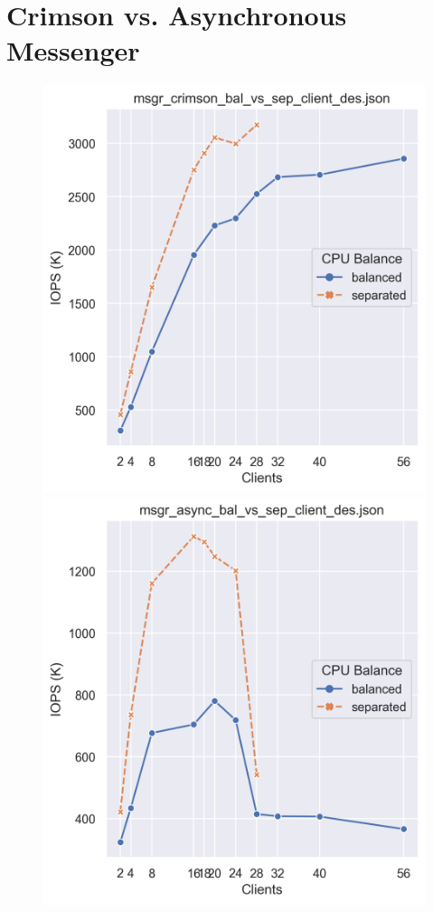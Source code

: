 
\chapter{Crimson vs. Asynchronous Messenger}

\graphicspath{ {../figures} }

\begin{figure}[!ht]
  \centering
  \begin{minipage}{.5\textwidth}
  \centering
    \includegraphics[width=\textwidth]{msgr_crimson_bal_vs_sep_client_des_iops.png}
  \end{minipage}%
  \begin{minipage}{.5\textwidth}
  \centering
    \includegraphics[width=\textwidth]{msgr_async_bal_vs_sep_client_des_iops.png}

\end{minipage}
\end{figure}
